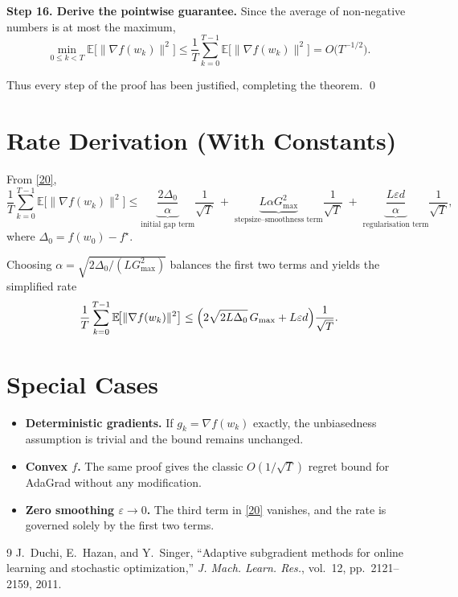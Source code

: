 \documentclass[11pt]{article}
\newcommand{\E}{\mathbb{E}}
\begin{document}
\noindent\textbf{Step 16. Derive the pointwise guarantee.}  
Since the average of non‑negative numbers is at most the maximum,
\[
\min_{0\le k<T}\E\!\bigl[\|\nabla f(w_{k})\|^{2}\bigr]
\le
\frac{1}{T}\sum_{k=0}^{T-1}\E\!\bigl[\|\nabla f(w_{k})\|^{2}\bigr]
=O\!\bigl(T^{-1/2}\bigr).
\tag{21}
\]

Thus every step of the proof has been justified, completing the theorem. \qed

\section*{Rate Derivation (With Constants)}
From \eqref{20},
\[
\boxed{
\frac{1}{T}\sum_{k=0}^{T-1}\E\!\bigl[\|\nabla f(w_{k})\|^{2}\bigr]
\le
\underbrace{\frac{2\Delta_{0}}{\alpha}}_{\text{initial gap term}}
\frac{1}{\sqrt{T}}
\;+\;
\underbrace{L\alpha G_{\max}^{2}}_{\text{stepsize–smoothness term}}
\frac{1}{\sqrt{T}}
\;+\;
\underbrace{\frac{L\varepsilon d}{\alpha}}_{\text{regularisation term}}
\frac{1}{\sqrt{T}},
}
\]
where $\Delta_{0}=f(w_{0})-f^{\star}$.

Choosing $\alpha=\sqrt{2\Delta_{0}/(L G_{\max}^{2})}$ balances the first two
terms and yields the simplified rate
\[
\frac{1}{T}\sum_{k=0}^{T-1}\E\!\bigl[\|\nabla f(w_{k})\|^{2}\bigr]
\le
\Bigl(2\sqrt{2L\Delta_{0}}\,G_{\max}+L\varepsilon d\Bigr)\frac{1}{\sqrt{T}}.
\]

\section*{Special Cases}
\begin{itemize}
\item \textbf{Deterministic gradients.} If $g_{k}=\nabla f(w_{k})$ exactly,
the unbiasedness assumption is trivial and the bound remains unchanged.
\item \textbf{Convex $f$.} The same proof gives the classic $O(1/\sqrt{T})$
regret bound for AdaGrad without any modification.
\item \textbf{Zero smoothing $\varepsilon\to0$.} The third term in \eqref{20}
vanishes, and the rate is governed solely by the first two terms.
\end{itemize}

\begin{thebibliography}{9}
J.~Duchi, E.~Hazan, and Y.~Singer,
\newblock ``Adaptive subgradient methods for online learning and stochastic
optimization,'' \emph{J. Mach. Learn. Res.}, vol.~12, pp.~2121--2159, 2011.
\end{thebibliography}
\end{document}
